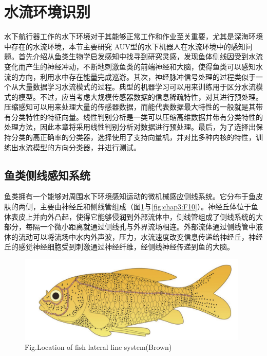\section{水流环境识别 }

水下航行器工作的水下环境对于其能够正常工作和作业至关重要，尤其是深海环境中存在的水流环境，本节主要研究
AUV型的水下机器人在水流环境中的感知问题\cite{verschure2003environmentally,fossen1994guidance}。首先介绍从鱼类生物学启发感知中找寻到研究灵感，发现鱼体侧线因受到水流变化而产生的神经冲动，不断地刺激鱼类的前端神经和大脑，使得鱼类可以感知水流的方向，利用水中存在能量完成巡游。其次，神经脉冲信号处理的过程类似于一个从大量数据学习水流模式的过程\cite{abdulsadda2013underwater,abdulsadda2012artificial,yang2010artificial,ren2012model}。典型的机器学习可以用来训练用于区分水流模式的模型\cite{liu2012support}。不过，应当考虑大规模传感器数据的信息稀疏特性，对其进行预处理\cite{chen2000new}。压缩感知可以用来处理大量的传感器数据，而能代表数据最大特性的一般就是其带有分类特性的特征向量。线性判别分析是一类可以压缩高维数据并带有分类特性的处理方法，因此本章将采用线性判别分析对数据进行预处理\cite{chen2000new,martis2013ecg}。最后，为了选择出保持分类的高正确率的分类器，选择使用了支持向量机，并对比多种内核的特性，训练出水流模型的方向分类器，并进行测试。

\subsection{鱼类侧线感知系统 }

鱼类拥有一个能够对周围水下环境感知运动的微机械感应侧线系统。它分布于鱼皮肤的两侧，主要由神经丘和侧线管组成（图\ref{fig:chap3:F9}与\ref{fig:chap3:F10}）。神经丘体位于鱼体表皮上并向外凸起，使得它能够侵润到外部流体中，侧线管组成了侧线系统的大部分，每隔一个微小距离就通过侧线孔与外界流场相连。外部流体通过侧线管中液体的流动可以将流场中水内外声波，压力，水流速度改变信息传递给神经丘，神经丘的感觉神经细胞受到刺激通过神经纤维，经侧线神经传递到鱼的大脑。

    \begin{figure}[!htp]
    \centering
        \includegraphics[width=11cm]{figure/chap3/fig1.jpg}
        \label{fig:chap3:F9}
         {Fig.}{Location of fish lateral line system(Brown)\cite{abdulsadda2012artificial} }
    \end{figure}

